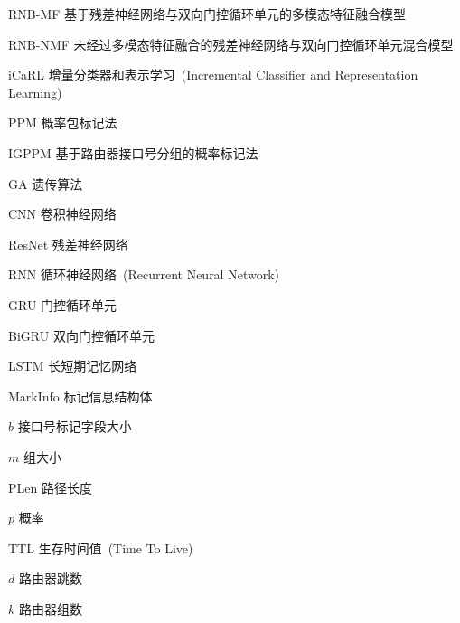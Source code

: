 \begin{denotation}

\item[RNB-MF] 基于残差神经网络与双向门控循环单元的多模态特征融合模型
\item[RNB-NMF] 未经过多模态特征融合的残差神经网络与双向门控循环单元混合模型
\item[iCaRL] 增量分类器和表示学习~(Incremental Classifier and Representation Learning)
\item[PPM] 概率包标记法
\item[IGPPM] 基于路由器接口号分组的概率标记法
\item[GA]	遗传算法
\item[CNN]	卷积神经网络
\item[ResNet]	残差神经网络
\item[RNN]	循环神经网络~(Recurrent Neural Network)
\item[GRU]	门控循环单元
\item[BiGRU] 双向门控循环单元
\item[LSTM]  	长短期记忆网络
\item [MarkInfo] 标记信息结构体
\item[$b$] 接口号标记字段大小
\item[$m$] 组大小
\item[PLen] 路径长度
\item[$p$] 概率
\item[TTL] 生存时间值~(Time To Live)
\item[$d$] 路由器跳数
\item[$k$] 路由器组数
\end{denotation}
